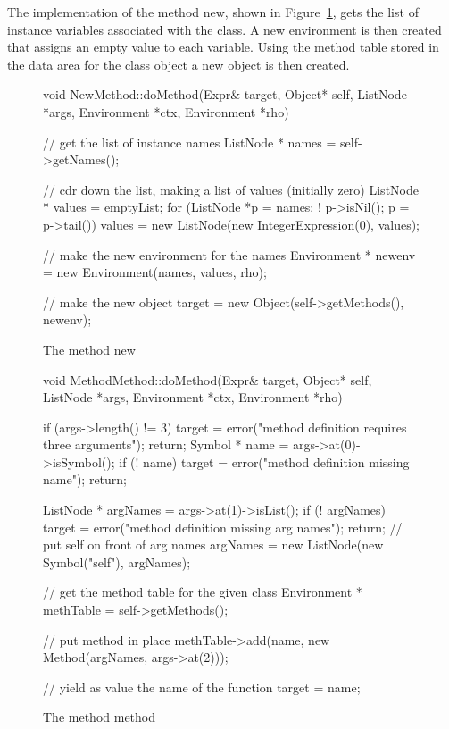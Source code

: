 The implementation of the method {\sf new}, shown in
Figure~\ref{newmethod}, gets the list of instance variables associated
with the class.  A new environment is then created that assigns an empty
value to each variable.  Using the method table stored in the data area for
the class object a new object is then created.

\begin{figure}
\begin{cprog}
void NewMethod::doMethod(Expr& target, Object* self, ListNode *args,
	Environment *ctx, Environment *rho)
{
	// get the list of instance names
	ListNode * names = self->getNames();

	// cdr down the list, making a list of values (initially zero)
	ListNode * values = emptyList;
	for (ListNode *p = names; ! p->isNil(); p = p->tail())
		values = new ListNode(new IntegerExpression(0), values);

	// make the new environment for the names
	Environment * newenv = new Environment(names, values, rho);

	// make the new object
	target = new Object(self->getMethods(), newenv);
}
\end{cprog}
\caption{The method {\sf new}}\label{newmethod}
\end{figure}

\begin{figure}
\begin{cprog}
void MethodMethod::doMethod(Expr& target, Object* self, ListNode *args,
	Environment *ctx, Environment *rho)
{
	if (args->length() != 3) {
		target = error("method definition requires three arguments");
		return;
		}
	Symbol * name = args->at(0)->isSymbol();
	if (! name) {
		target = error("method definition missing name");
		return;
		}

	ListNode * argNames = args->at(1)->isList();
	if (! argNames) {
		target = error("method definition missing arg names");
		return;
		}
	// put self on front of arg names
	argNames = new ListNode(new Symbol("self"), argNames);

	// get the method table for the given class
	Environment * methTable = self->getMethods();

	// put method in place
	methTable->add(name, new Method(argNames, args->at(2)));

	// yield as value the name of the function
	target = name;
}
\end{cprog}
\caption{The method {\sf method}}\label{methodmethod}
\end{figure}

